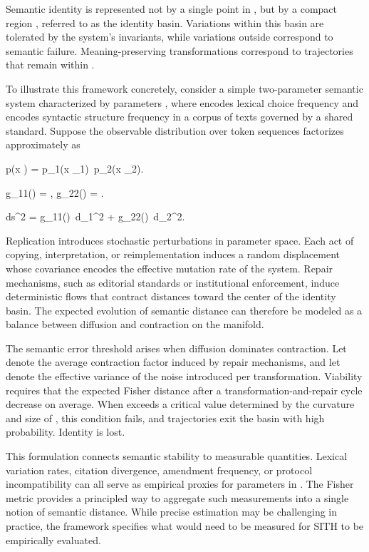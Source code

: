 \documentclass[11pt,oneside]{article}
\begin{document}
Semantic identity is represented not by a single point in , but by a compact region , referred to as the identity basin. Variations within this basin are tolerated by the system’s invariants, while variations outside correspond to semantic failure. Meaning-preserving transformations correspond to trajectories that remain within .

To illustrate this framework concretely, consider a simple two-parameter semantic system characterized by parameters , where  encodes lexical choice frequency and  encodes syntactic structure frequency in a corpus of texts governed by a shared standard. Suppose the observable distribution over token sequences factorizes approximately as

p(x \mid \theta) = p_1(x \mid \theta_1)\, p_2(x \mid \theta_2).

g_{11}(\theta) = , \quad
g_{22}(\theta) = .

ds^2 = g_{11}(\theta)\, d\theta_1^2 + g_{22}(\theta)\, d\theta_2^2.

Replication introduces stochastic perturbations in parameter space. Each act of copying, interpretation, or reimplementation induces a random displacement  whose covariance encodes the effective mutation rate of the system. Repair mechanisms, such as editorial standards or institutional enforcement, induce deterministic flows that contract distances toward the center of the identity basin. The expected evolution of semantic distance can therefore be modeled as a balance between diffusion and contraction on the manifold.

The semantic error threshold arises when diffusion dominates contraction. Let  denote the average contraction factor induced by repair mechanisms, and let  denote the effective variance of the noise introduced per transformation. Viability requires that the expected Fisher distance after a transformation-and-repair cycle decrease on average. When  exceeds a critical value determined by the curvature and size of , this condition fails, and trajectories exit the basin with high probability. Identity is lost.

This formulation connects semantic stability to measurable quantities. Lexical variation rates, citation divergence, amendment frequency, or protocol incompatibility can all serve as empirical proxies for parameters in . The Fisher metric provides a principled way to aggregate such measurements into a single notion of semantic distance. While precise estimation may be challenging in practice, the framework specifies what would need to be measured for SITH to be empirically evaluated.
\end{document}
